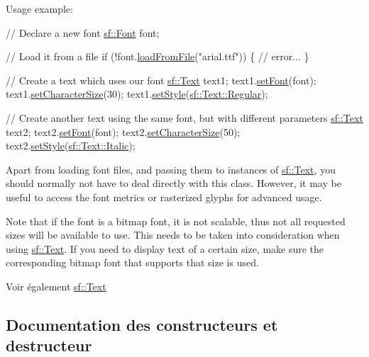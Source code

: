 Usage example\+: 
\begin{DoxyCode}
\textcolor{comment}{// Declare a new font}
\hyperlink{classsf_1_1Font}{sf::Font} font;

\textcolor{comment}{// Load it from a file}
\textcolor{keywordflow}{if} (!font.\hyperlink{classsf_1_1Font_ab020052ef4e01f6c749a85571c0f3fd1}{loadFromFile}(\textcolor{stringliteral}{"arial.ttf"}))
\{
    \textcolor{comment}{// error...}
\}

\textcolor{comment}{// Create a text which uses our font}
\hyperlink{classsf_1_1Text}{sf::Text} text1;
text1.\hyperlink{classsf_1_1Text_a2927805d1ae92d57f15034ea34756b81}{setFont}(font);
text1.\hyperlink{classsf_1_1Text_ae96f835fc1bff858f8a23c5b01eaaf7e}{setCharacterSize}(30);
text1.\hyperlink{classsf_1_1Text_ad791702bc2d1b6590a1719aa60635edf}{setStyle}(\hyperlink{classsf_1_1Text_aa8add4aef484c6e6b20faff07452bd82a2af9ae5e1cda126570f744448e0caa32}{sf::Text::Regular});

\textcolor{comment}{// Create another text using the same font, but with different parameters}
\hyperlink{classsf_1_1Text}{sf::Text} text2;
text2.\hyperlink{classsf_1_1Text_a2927805d1ae92d57f15034ea34756b81}{setFont}(font);
text2.\hyperlink{classsf_1_1Text_ae96f835fc1bff858f8a23c5b01eaaf7e}{setCharacterSize}(50);
text2.\hyperlink{classsf_1_1Text_ad791702bc2d1b6590a1719aa60635edf}{setStyle}(\hyperlink{classsf_1_1Text_aa8add4aef484c6e6b20faff07452bd82aee249eb803848723c542c2062ebe69d8}{sf::Text::Italic});
\end{DoxyCode}


Apart from loading font files, and passing them to instances of \hyperlink{classsf_1_1Text}{sf\+::\+Text}, you should normally not have to deal directly with this class. However, it may be useful to access the font metrics or rasterized glyphs for advanced usage.

Note that if the font is a bitmap font, it is not scalable, thus not all requested sizes will be available to use. This needs to be taken into consideration when using \hyperlink{classsf_1_1Text}{sf\+::\+Text}. If you need to display text of a certain size, make sure the corresponding bitmap font that supports that size is used.

\begin{DoxySeeAlso}{Voir également}
\hyperlink{classsf_1_1Text}{sf\+::\+Text} 
\end{DoxySeeAlso}


\subsection{Documentation des constructeurs et destructeur}
\mbox{\label{classsf_1_1Font_a506404655b8869ed60d1e7709812f583}} 
